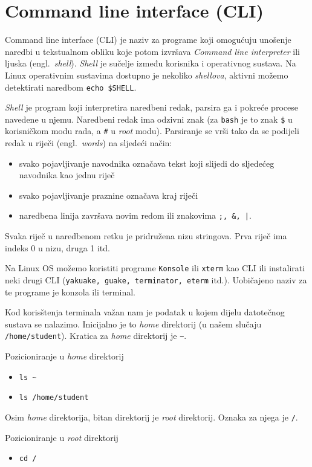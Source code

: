 
\section{Command line interface (CLI)}
Command line interface (CLI) je naziv za programe koji omogućuju unošenje naredbi u tekstualnom obliku koje potom izvršava \textit{Command line interpreter} ili ljuska (engl.~\textit{shell}). \textit{Shell} je sučelje između korisnika i operativnog sustava. Na Linux operativnim sustavima dostupno je nekoliko \textit{shellova}, aktivni možemo detektirati naredbom \lstinline!echo $SHELL!.

\textit{Shell} je program koji interpretira naredbeni redak, parsira ga i pokreće procese navedene u njemu. Naredbeni redak ima odzivni znak (za \texttt{bash} je to znak \lstinline!$! u korisničkom modu rada, a \lstinline!#! u \textit{root} modu). Parsiranje se vrši tako da se podijeli redak u riječi (engl.~\textit{words}) na sljedeći način:
\begin{itemize}
 \item svako pojavljivanje navodnika označava tekst koji slijedi do sljedećeg navodnika kao jednu riječ
 \item svako pojavljivanje praznine označava kraj riječi
 \item naredbena linija završava novim redom ili znakovima \lstinline!;, &, |!.
\end{itemize}
Svaka riječ u naredbenom retku je pridružena nizu stringova. Prva riječ ima indeks 0 u nizu, druga 1 itd.

Na Linux OS možemo koristiti programe \texttt{Konsole} ili \texttt{xterm} kao CLI  ili instalirati neki drugi CLI (\texttt{yakuake, guake, terminator, eterm} itd.). Uobičajeno naziv za te programe je konzola ili terminal.

Kod korisštenja terminala važan nam je podatak u kojem dijelu datotečnog sustava se nalazimo. Inicijalno je to \textit{home} direktorij (u našem slučaju \texttt{/home/student}). Kratica za \textit{home} direktorij je \lstinline!~!.

\begin{primjer}
Pozicioniranje u \textit{home} direktorij
\begin{itemize}
\item \lstinline!ls ~! 
\item \lstinline!ls /home/student! 
\end{itemize}
\end{primjer}

Osim \textit{home} direktorija, bitan direktorij je \textit{root} direktorij. Oznaka za njega je \lstinline!/!.
\begin{primjer}
Pozicioniranje u \textit{root} direktorij
\begin{itemize}
 \item \lstinline!cd /!
\end{itemize}

\end{primjer}


